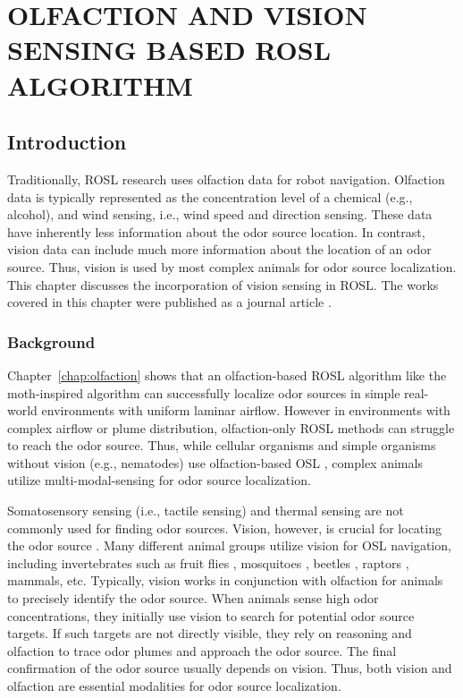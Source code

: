 \chapter{OLFACTION AND VISION SENSING BASED ROSL ALGORITHM}\label{chap:fusion}

\section{Introduction}
Traditionally, ROSL research uses olfaction data for robot navigation. Olfaction data is typically represented as the concentration level of a chemical (e.g., alcohol), and wind sensing, i.e., wind speed and direction sensing. These data have inherently less information about the odor source location. In contrast, vision data can include much more information about the location of an odor source. Thus, vision is used by most complex animals for odor source localization. 
This chapter discusses the incorporation of vision sensing in ROSL. The works covered in this chapter were published as a journal article \cite{hassan2024robotic}.

\subsection{Background}\label{Subsec:fusionBackground}
Chapter~\ref{chap:olfaction} shows that an olfaction-based ROSL algorithm like the moth-inspired algorithm can successfully localize odor sources in simple real-world environments with uniform laminar airflow. However in environments with complex airflow or plume distribution, olfaction-only ROSL methods can struggle to reach the odor source. Thus, while cellular organisms and simple organisms without vision (e.g., nematodes) use olfaction-based OSL \cite{lockery2011computational}, complex animals utilize multi-modal-sensing for odor source localization.

Somatosensory sensing (i.e., tactile sensing) and thermal sensing are not commonly used for finding odor sources. Vision, however, is crucial for locating the odor source \cite{kuang2014smelling}. Many different animal groups utilize vision for OSL navigation, including invertebrates such as fruit flies \cite{frye2009visually}, mosquitoes \cite{van2015mosquitoes}, beetles \cite{l2015integration}, raptors \cite{potier2019sight}, mammals, etc. Typically, vision works in conjunction with olfaction for animals to precisely identify the odor source. When animals sense high odor concentrations, they initially use vision to search for potential odor source targets. If such targets are not directly visible, they rely on reasoning and olfaction to trace odor plumes and approach the odor source. The final confirmation of the odor source usually depends on vision. Thus, both vision and olfaction are essential modalities for odor source localization.

